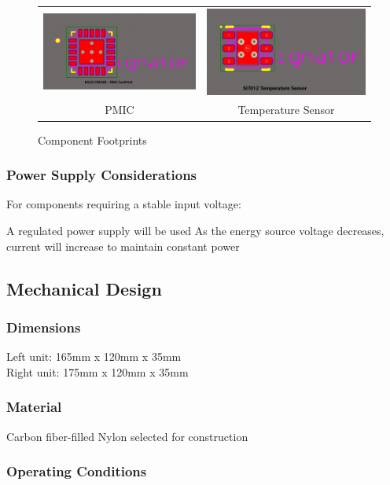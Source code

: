 \documentclass[a4paper,11pt]{article}%
\begin{document}
\begin{figure}[H]
\begin{tabular}{cc}
        \includegraphics[width=0.40\linewidth]{figures/PMIC.jpg} &
        \includegraphics[width=0.40\linewidth]{figures/Temperature sensor.jpg} \\
        PMIC & Temperature Sensor
    \end{tabular}
    \caption{Component Footprints}
    \label{fig:component_footprints}
\end{figure}

\subsubsection{Power Supply Considerations}
For components requiring a stable input voltage:

A regulated power supply will be used
As the energy source voltage decreases, current will increase to maintain constant power

\subsection{Mechanical Design}
\subsubsection{Dimensions}

Left unit: 165mm x 120mm x 35mm\\
Right unit: 175mm x 120mm x 35mm

\subsubsection{Material}
Carbon fiber-filled Nylon selected for construction
\subsubsection{Operating Conditions}
\end{document}
